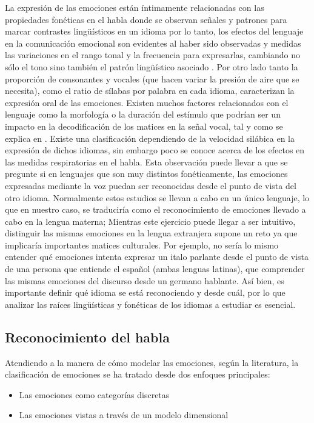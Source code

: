 \documentclass[11pt,a4paper,spanish]{book}
\begin{document}
	La expresión de las emociones están íntimamente relacionadas con las propiedades fonéticas en el habla donde se observan señales y patrones para marcar contrastes lingüísticos en un idioma \cite{Pell2001} por lo tanto, los efectos del lenguaje en la comunicación emocional son evidentes al haber sido observadas y medidas las variaciones en el rango tonal y la frecuencia para expresarlas, cambiando no sólo el tono sino también el patrón lingüístico asociado \cite{Davletcharova2015}.
	Por otro lado tanto la proporción de consonantes y vocales (que hacen variar la presión de aire que se necesita), como el ratio de sílabas por palabra en cada idioma, caracterizan la expresión oral de las emociones. Existen muchos factores relacionados con el lenguaje como la morfología o la duración del estímulo que podrían ser un impacto en la decodificación de los matices en la señal vocal, tal y como se explica en \cite{Chen2017}.
	Existe una clasificación dependiendo de la velocidad silábica en la expresión de dichos idiomas, sin embargo poco se conoce acerca de los efectos en las medidas respiratorias en el habla. Esta observación puede llevar a que se pregunte si en lenguajes que son muy distintos fonéticamente, las emociones expresadas mediante la voz puedan ser reconocidas desde el punto de vista del otro idioma.
	Normalmente estos estudios se llevan a cabo en un único lenguaje, lo que en nuestro caso, se traduciría como el reconocimiento de emociones llevado a cabo en la lengua materna; Mientras este ejercicio puede llegar a ser intuitivo, distinguir las mismas emociones en la lengua extranjera supone un reto ya que implicaría importantes matices culturales. Por ejemplo, no sería lo mismo entender qué emociones intenta expresar un italo parlante desde el punto de vista de una persona que entiende el español (ambas lenguas latinas), que comprender las mismas emociones del discurso desde un germano hablante. Así bien, es importante definir qué idioma se está reconociendo y desde cuál, por lo que analizar las raíces lingüísticas y fonéticas de los idiomas a estudiar es esencial. \hfill \break
	
	\subsection{Reconocimiento del habla}
	Atendiendo a la manera de cómo modelar las emociones, según la literatura, la clasificación de emociones se ha tratado desde dos enfoques principales:
	\begin{itemize}
		\item Las emociones como categorías discretas
		\item Las emociones vistas a través de un modelo dimensional
	\end{itemize}
\end{document}
